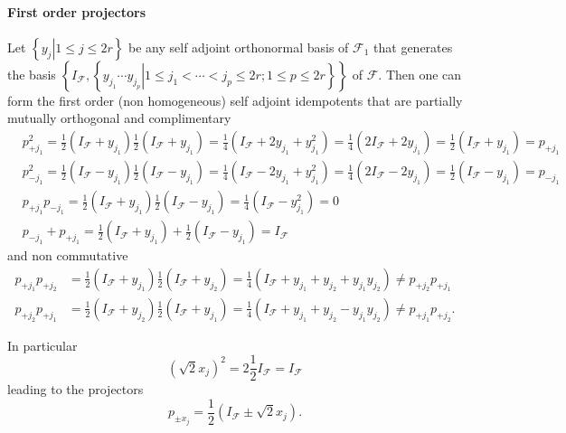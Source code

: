 \documentclass[aps,preprint]{revtex4}%
\begin{document}
\paragraph{First order projectors}

Let $\left\{  \left.  y_{j}\right\vert 1\leq j\leq2r\right\}  $ be any self
adjoint orthonormal basis of $\mathcal{F}_{1}$ that generates the basis
$\left\{  I_{\mathcal{F}},\left\{  \left.  y_{j_{1}}\cdots y_{j_{p}%
}\right\vert 1\leq j_{1}<\cdots<j_{p}\leq2r;1\leq p\leq2r\right\}  \right\}  $
of $\mathcal{F}.$ Then one can form the first order (non homogeneous) self
adjoint idempotents that are partially mutually orthogonal and complimentary
\begin{align}
&  p_{+j_{1}}^{2}=\frac{1}{2}\left(  I_{\mathcal{F}}+y_{j_{1}}\right)
\frac{1}{2}\left(  I_{\mathcal{F}}+y_{j_{1}}\right)  =\frac{1}{4}\left(
I_{\mathcal{F}}+2y_{j_{1}}+y_{j_{1}}^{2}\right)  =\frac{1}{4}\left(
2I_{\mathcal{F}}+2y_{j_{1}}\right)  =\frac{1}{2}\left(  I_{\mathcal{F}%
}+y_{j_{1}}\right)  =p_{+j_{1}}\\
&  p_{-j_{1}}^{2}=\frac{1}{2}\left(  I_{\mathcal{F}}-y_{j_{1}}\right)
\frac{1}{2}\left(  I_{\mathcal{F}}-y_{j_{1}}\right)  =\frac{1}{4}\left(
I_{\mathcal{F}}-2y_{j_{1}}+y_{j_{1}}^{2}\right)  =\frac{1}{4}\left(
2I_{\mathcal{F}}-2y_{j_{1}}\right)  =\frac{1}{2}\left(  I_{\mathcal{F}%
}-y_{j_{1}}\right)  =p_{-j_{1}}\\
&  p_{+j_{1}}p_{-j_{1}}=\frac{1}{2}\left(  I_{\mathcal{F}}+y_{j_{1}}\right)
\frac{1}{2}\left(  I_{\mathcal{F}}-y_{j_{1}}\right)  =\frac{1}{4}\left(
I_{\mathcal{F}}-y_{j_{1}}^{2}\right)  =0\\
&  p_{-j_{1}}+p_{+j_{1}}=\frac{1}{2}\left(  I_{\mathcal{F}}+y_{j_{1}}\right)
+\frac{1}{2}\left(  I_{\mathcal{F}}-y_{j_{1}}\right)  =I_{\mathcal{F}}%
\end{align}
and non commutative
\begin{align}
p_{+j_{1}}p_{+j_{2}}  &  =\frac{1}{2}\left(  I_{\mathcal{F}}+y_{j_{1}}\right)
\frac{1}{2}\left(  I_{\mathcal{F}}+y_{j_{2}}\right)  =\frac{1}{4}\left(
I_{\mathcal{F}}+y_{j_{1}}+y_{j_{2}}+y_{j_{1}}y_{j_{2}}\right)  \neq p_{+j_{2}%
}p_{+j_{1}}\\
p_{+j_{2}}p_{+j_{1}}  &  =\frac{1}{2}\left(  I_{\mathcal{F}}+y_{j_{2}}\right)
\frac{1}{2}\left(  I_{\mathcal{F}}+y_{j_{1}}\right)  =\frac{1}{4}\left(
I_{\mathcal{F}}+y_{j_{1}}+y_{j_{2}}-y_{j_{1}}y_{j_{2}}\right)  \neq p_{+j_{1}%
}p_{+j_{2}}.
\end{align}


In particular
\begin{equation}
\left(  \sqrt{2}x_{j}\right)  ^{2}=2\frac{1}{2}I_{\mathcal{F}}=I_{\mathcal{F}}%
\end{equation}
leading to the projectors%
\begin{equation}
p_{\pm x_{j}}=\frac{1}{2}\left(  I_{\mathcal{F}}\pm\sqrt{2}x_{j}\right)  .
\end{equation}
\end{document}
